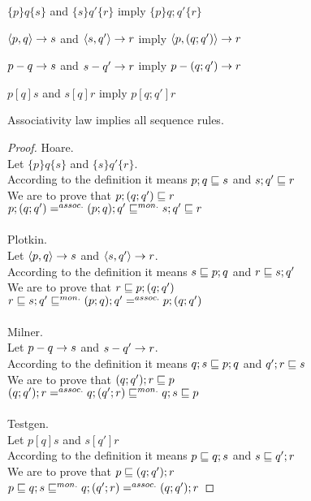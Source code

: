 \documentclass{article}
\begin{document}
\begin{rul}
$\{p\}q\{s\}$ and $\{s\}q'\{r\}$ imply $\{p\}q;q'\{r\}$
\end{rul}

\begin{rul}
$\left< p, q \right> \rightarrow s$ and $\left< s, q' \right> \rightarrow r$ imply $\left< p, (q; q') \right> \rightarrow r$
\end{rul}

\begin{rul}
$p-q\rightarrow s$ and $s-q'\rightarrow r$ imply $p-(q; q')\rightarrow r$
\end{rul}

\begin{rul}
$p [q] s$ and $s [q] r$ imply $p [q; q'] r$
\end{rul}

\begin{theorem}
Associativity law implies all sequence rules.
\end{theorem}

\verified

\begin{proof}
Hoare.\\
Let $\{p\}q\{s\}$ and $\{s\}q'\{r\}$.\\
According to the definition it means $p; q \sqsubseteq s$ and $s; q' \sqsubseteq r$\\
We are to prove that $p; (q; q') \sqsubseteq r$\\
$p; (q; q') =^{assoc.} (p; q); q' \sqsubseteq^{mon.} s; q' \sqsubseteq r$\\
\\
Plotkin.\\
Let $\left< p, q \right> \rightarrow s$ and $\left< s, q' \right> \rightarrow r$.\\
According to the definition it means $s \sqsubseteq p; q$ and $r \sqsubseteq s; q'$\\
We are to prove that $r \sqsubseteq p; (q; q')$\\
$r \sqsubseteq s; q' \sqsubseteq^{mon.} (p; q); q' =^{assoc.} p; (q; q')$\\
\\
Milner.\\
Let $p-q\rightarrow s$ and $s-q'\rightarrow r$.\\
According to the definition it means $q; s \sqsubseteq p; q$ and $q'; r \sqsubseteq s$\\
We are to prove that $(q; q'); r \sqsubseteq p$\\
$(q; q'); r =^{assoc.} q; (q'; r) \sqsubseteq^{mon.} q; s \sqsubseteq p$\\
\\
Testgen.\\
Let $p [q] s$ and $s [q'] r$\\
According to the definition it means $p \sqsubseteq q; s$ and $s \sqsubseteq q'; r$\\
We are to prove that $p \sqsubseteq (q; q'); r$\\
$p \sqsubseteq q; s \sqsubseteq^{mon.} q; (q'; r) =^{assoc.} (q; q'); r$
\end{proof}
\end{document}
